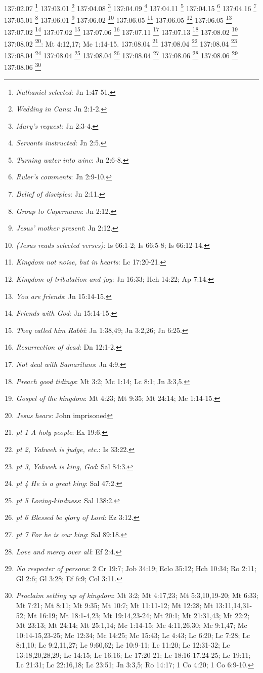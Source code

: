 {{{{{{{{137:02.07 \footnote{\textit{Nathaniel selected}: Jn 1:47-51.}
137:03.01 \footnote{\textit{Wedding in Cana}: Jn 2:1-2.}
137:04.08 \footnote{\textit{Mary's request}: Jn 2:3-4.}
137:04.09 \footnote{\textit{Servants instructed}: Jn 2:5.}
137:04.11 \footnote{\textit{Turning water into wine}: Jn 2:6-8.}
137:04.15 \footnote{\textit{Ruler's comments}: Jn 2:9-10.}
137:04.16 \footnote{\textit{Belief of disciples}: Jn 2:11.}
137:05.01 \footnote{\textit{Group to Capernaum}: Jn 2:12.}
137:06.01 \footnote{\textit{Jesus' mother present}: Jn 2:12.}
137:06.02 \footnote{\textit{(Jesus reads selected verses)}: Is 66:1-2; Is 66:5-8; Is 66:12-14.}
137:06.05 \footnote{\textit{Kingdom not noise, but in hearts}: Lc 17:20-21.}
137:06.05 \footnote{\textit{Kingdom of tribulation and joy}: Jn 16:33; Hch 14:22; Ap 7:14.}
137:06.05 \footnote{\textit{You are friends}: Jn 15:14-15.}
137:07.02 \footnote{\textit{Friends with God}: Jn 15:14-15.}
137:07.02 \footnote{\textit{They called him Rabbi}: Jn 1:38,49; Jn 3:2,26; Jn 6:25.}
137:07.06 \footnote{\textit{Resurrection of dead}: Dn 12:1-2.}
137:07.11 \footnote{\textit{Not deal with Samaritans}: Jn 4:9.}
137:07.13 \footnote{\textit{Preach good tidings}: Mt 3:2; Mc 1:14; Lc 8:1; Jn 3:3,5.}
137:08.02 \footnote{\textit{Gospel of the kingdom}: Mt 4:23; Mt 9:35; Mt 24:14; Mc 1:14-15.}
137:08.02 \footnote{\textit{Jesus hears}: John imprisoned}: Mt 4:12,17; Mc 1:14-15.}
137:08.04 \footnote{\textit{pt 1 A holy people}: Ex 19:6.}
137:08.04 \footnote{\textit{pt 2, Yahweh is judge, etc.}: Is 33:22.}
137:08.04 \footnote{\textit{pt 3, Yahweh is king, God}: Sal 84:3.}
137:08.04 \footnote{\textit{pt 4 He is a great king}: Sal 47:2.}
137:08.04 \footnote{\textit{pt 5 Loving-kindness}: Sal 138:2.}
137:08.04 \footnote{\textit{pt 6 Blessed be glory of Lord}: Ez 3:12.}
137:08.04 \footnote{\textit{pt 7 For he is our king}: Sal 89:18.}
137:08.06 \footnote{\textit{Love and mercy over all}: Ef 2:4.}
137:08.06 \footnote{\textit{No respecter of persons}: 2 Cr 19:7; Job 34:19; Eclo 35:12; Hch 10:34; Ro 2:11; Gl 2:6; Gl 3:28; Ef 6:9; Col 3:11.}
137:08.06 \footnote{\textit{Proclaim setting up of kingdom}: Mt 3:2; Mt 4:17,23; Mt 5:3,10,19-20; Mt 6:33; Mt 7:21; Mt 8:11; Mt 9:35; Mt 10:7; Mt 11:11-12; Mt 12:28; Mt 13:11,14,31-52; Mt 16:19; Mt 18:1-4,23; Mt 19:14,23-24; Mt 20:1; Mt 21:31,43; Mt 22:2; Mt 23:13; Mt 24:14; Mt 25:1,14; Mc 1:14-15; Mc 4:11,26,30; Mc 9:1,47; Mc 10:14-15,23-25; Mc 12:34; Mc 14:25; Mc 15:43; Lc 4:43; Lc 6:20; Lc 7:28; Lc 8:1,10; Lc 9:2,11,27; Lc 9:60,62; Lc 10:9-11; Lc 11:20; Lc 12:31-32; Lc 13:18,20,28,29; Lc 14:15; Lc 16:16; Lc 17:20-21; Lc 18:16-17,24-25; Lc 19:11; Lc 21:31; Lc 22:16,18; Lc 23:51; Jn 3:3,5; Ro 14:17; 1 Co 4:20; 1 Co 6:9-10.}
}}}}}}}
